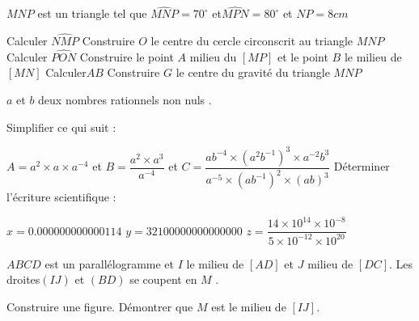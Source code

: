 \documentclass[a4paper,addpoints,12pt]{exam}
\begin{document}
\devoir[ds=false,num=3 ,niv=2 , date=05/01/2023,Rdate=09/01/2023 ]

\begin{exo}
$MNP$ est un triangle tel que  $\widehat{MNP}=70^{\circ}$ et$\widehat{MPN}=80^{\circ}$ et $NP=8 cm$
\begin{questions}
\question Calculer $\widehat{NMP}$
\question Construire  $O$ le centre du cercle circonscrit au triangle $MNP$
\question Calculer $\widehat{PON}$
\question Construire le point  $A$ milieu du  $[MP]$ et le point $B$ le milieu de$[MN]$
\question Calculer$AB$
\question Construire $G$ le centre du gravité du triangle $MNP$

\end{questions}

\end{exo}

\begin{exo}
$a$ et $b$ deux nombres rationnels non nuls .
\begin{questions}
\question Simplifier ce qui suit :

$A=a^{2}\times a \times a^{-4} $ \hspace{1cm} et $B=\dfrac{a^{2}\times a^{3}}{a^{-4}}$ \hspace{1cm} et
$C=\dfrac{ab^{-4}\times (a^{2}b^{-1})^{3}\times a^{-2}b^{3}}{a^{-5}\times (ab^{-1})^{2}\times (ab)^{3}}$
\question Déterminer l'écriture scientifique : 

$x=0.000000000000114$\hspace{1cm}
$y=32100000000000000$\hspace{1cm}
$z=\dfrac{14\times 10^{14}\times 10^{-8}}{5\times 10^{-12}\times 10^{20}}$

\end{questions}

\end{exo}

\begin{exo}
$ABCD$ est un parallélogramme et  $I$ le milieu de  $[AD]$ et $J$ milieu de $[DC]$. Les droites$(IJ)$ et $(BD)$ se coupent en  $M$ .
\begin{questions}
\question Construire une figure.
\question Démontrer que $M$ est le milieu de $[IJ]$.
\end{questions}
\end{exo}
\end{document}
